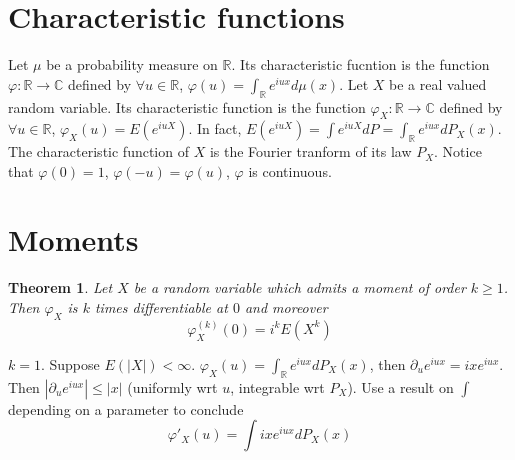 \documentclass[10pt,a4paper]{book}
\newcommand{\R}{\mathbb{R}}
\newtheorem{theorem}{Theorem}[section]
\theoremstyle{definition}
\begin{document}
\section{Characteristic functions}
Let $\mu$ be a probability measure on $\R$. Its characteristic fucntion is the function $\varphi:\R\to\mathbb{C}$ defined by $\forall u\in\R$, $\varphi(u)=\int_{\R}e^{iux}d\mu(x)$. Let $X$ be a real valued random variable. Its characteristic function is the function $\varphi_X:\R\to\mathbb{C}$ defined by $\forall u\in\R$, $\varphi_X(u)=E(e^{iuX})$. In fact, $E(e^{iuX})=\int e^{iuX}dP=\int_{\R}e^{iux}dP_X(x)$. The characteristic function of $X$ is the Fourier tranform of its law $P_X$. Notice that $\varphi(0)=1$, $\varphi(-u)=\varphi(u)$, $\varphi$ is continuous. 

\section{Moments}
\begin{theorem}
Let $X$ be a random variable which admits a moment of order $k\geq 1$. Then $\varphi_X$ is $k$ times differentiable at $0$ and moreover
$$\varphi_X^{(k)}(0)=i^kE(X^k)$$
\end{theorem}
\proof $k=1$. Suppose $E(|X|)<\infty$. $\varphi_X(u)=\int_{\R}e^{iux}dP_X(x)$, then $\partial_u e^{iux}=ixe^{iux}$. Then $|\partial_ue^{iux}|\leq |x|$ (uniformly wrt $u$, integrable wrt $P_X$). Use a result on $\int$ depending on a parameter to conclude
$$\varphi'_X(u)=\int ixe^{iux}dP_X(x)$$
\end{document}
